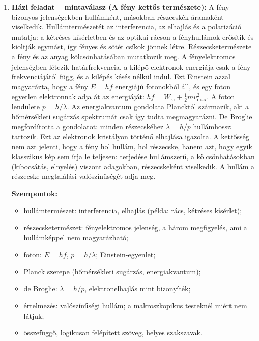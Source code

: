 \documentclass[11pt,a4paper]{article}
\begin{document}
\begin{enumerate}
\item \textbf{Házi feladat -- mintaválasz (A fény kettős természete):}
  A fény bizonyos jelenségekben hullámként, másokban részecskék áramaként viselkedik.
  Hullámtermészetét az interferencia, az elhajlás és a polarizáció mutatja: a
  kétréses kísérletben és az optikai rácson a fényhullámok erősítik és kioltják egymást,
  így fényes és sötét csíkok jönnek létre. Részecsketermészete a fény és az anyag
  kölcsönhatásában mutatkozik meg. A fényelektromos jelenségben létezik határfrekvencia,
  a kilépő elektronok energiája csak a fény frekvenciájától függ, és a kilépés késés
  nélkül indul. Ezt Einstein azzal magyarázta, hogy a fény $E = hf$ energiájú
  fotonokból áll, és egy foton egyetlen elektronnak adja át az energiáját:
  $hf = W_\text{ki} + \tfrac12 mv_\text{max}^2$. A foton lendülete $p = h/\lambda$.
  Az energiakvantum gondolata Plancktól származik, aki a hőmérsékleti sugárzás
  spektrumát csak így tudta megmagyarázni. De Broglie megfordította a gondolatot: minden
  részecskéhez $\lambda = h/p$ hullámhossz tartozik. Ezt az elektronok kristályon
  történő elhajlása igazolta. A kettősség nem azt jelenti, hogy a fény hol hullám, hol
  részecske, hanem azt, hogy egyik klasszikus kép sem írja le teljesen: terjedése
  hullámszerű, a kölcsönhatásokban (kibocsátás, elnyelés) viszont adagokban, részecskeként
  viselkedik. A hullám a részecske megtalálási valószínűségét adja meg.

  \medskip
  \textbf{Szempontok:}
  \begin{itemize}[nosep,leftmargin=1.5em]
    \item hullámtermészet: interferencia, elhajlás (példa: rács, kétréses kísérlet);
    \item részecsketermészet: fényelektromos jelenség, a három megfigyelés, ami a
      hullámképpel nem magyarázható;
    \item foton: $E = hf$, $p = h/\lambda$; Einstein-egyenlet;
    \item Planck szerepe (hőmérsékleti sugárzás, energiakvantum);
    \item de Broglie: $\lambda = h/p$, elektronelhajlás mint bizonyíték;
    \item értelmezés: valószínűségi hullám; a makroszkopikus testeknél miért nem
      látjuk;
    \item összefüggő, logikusan felépített szöveg, helyes szakszavak.
  \end{itemize}
\end{enumerate}
\end{document}
